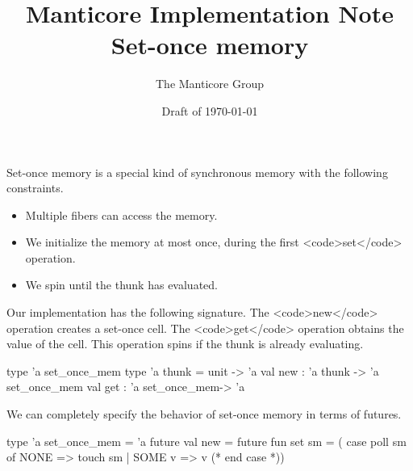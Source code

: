 \documentclass[11pt]{article}
\title{Manticore Implementation Note \\ Set-once memory}
\author{The Manticore Group}
\date{Draft of \today}
\begin{document}
\maketitle

Set-once memory is a special kind of synchronous memory with the following constraints.
\begin{itemize}
\item Multiple fibers can access the memory.
\item We initialize the memory at most once, during the first <code>set</code> operation.
\item We spin until the thunk has evaluated.
\end{itemize}

Our implementation has the following signature. The <code>new</code> operation creates a set-once cell. The <code>get</code> operation obtains the value of the cell. This operation spins if the thunk is already evaluating.
\begin{centercode}
  type 'a set_once_mem
  type 'a thunk = unit -> 'a
  val new : 'a thunk -> 'a set_once_mem
  val get : 'a set_once_mem-> 'a
\end{centercode}

We can completely specify the behavior of set-once memory in terms of futures.
\begin{centercode}
  type 'a set_once_mem = 'a future
  val new = future
  fun set sm = (
        case poll sm
          of NONE => touch sm
           | SOME v => v
        (* end case *))
\end{centercode}
\end{document}

